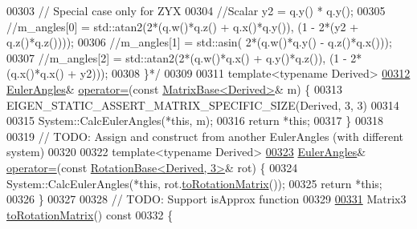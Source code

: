 \begin{DoxyCode}
00303 \textcolor{comment}{        // Special case only for ZYX}
00304 \textcolor{comment}{        //Scalar y2 = q.y() * q.y();}
00305 \textcolor{comment}{        //m\_angles[0] = std::atan2(2*(q.w()*q.z() + q.x()*q.y()), (1 - 2*(y2 + q.z()*q.z())));}
00306 \textcolor{comment}{        //m\_angles[1] = std::asin( 2*(q.w()*q.y() - q.z()*q.x()));}
00307 \textcolor{comment}{        //m\_angles[2] = std::atan2(2*(q.w()*q.x() + q.y()*q.z()), (1 - 2*(q.x()*q.x() + y2)));}
00308 \textcolor{comment}{      \}*/}
00309       
00311       \textcolor{keyword}{template}<\textcolor{keyword}{typename} Derived>
\hyperlink{class_eigen_1_1_euler_angles_af11e32e3584251f0dce65811ac6ad3b4}{00312}       \hyperlink{class_eigen_1_1_euler_angles}{EulerAngles}& \hyperlink{class_eigen_1_1_euler_angles_af11e32e3584251f0dce65811ac6ad3b4}{operator=}(\textcolor{keyword}{const} \hyperlink{group___core___module_class_eigen_1_1_matrix_base}{MatrixBase<Derived>}& m) \{
00313         EIGEN\_STATIC\_ASSERT\_MATRIX\_SPECIFIC\_SIZE(Derived, 3, 3)
00314         
00315         System::CalcEulerAngles(*\textcolor{keyword}{this}, m);
00316         \textcolor{keywordflow}{return} *\textcolor{keyword}{this};
00317       \}
00318 
00319       \textcolor{comment}{// TODO: Assign and construct from another EulerAngles (with different system)}
00320       
00322       \textcolor{keyword}{template}<\textcolor{keyword}{typename} Derived>
\hyperlink{class_eigen_1_1_euler_angles_abc2256872ea7e285cb915b8af82b6810}{00323}       \hyperlink{class_eigen_1_1_euler_angles}{EulerAngles}& \hyperlink{class_eigen_1_1_euler_angles_abc2256872ea7e285cb915b8af82b6810}{operator=}(\textcolor{keyword}{const} \hyperlink{class_eigen_1_1_rotation_base}{RotationBase<Derived, 3>}& 
      rot) \{
00324         System::CalcEulerAngles(*\textcolor{keyword}{this}, rot.\hyperlink{class_eigen_1_1_rotation_base_aac726e89402a427c605514ce31b01e42}{toRotationMatrix}());
00325         \textcolor{keywordflow}{return} *\textcolor{keyword}{this};
00326       \}
00327       
00328       \textcolor{comment}{// TODO: Support isApprox function}
00329 
\hyperlink{class_eigen_1_1_euler_angles_a11ec16b3ed918fac62d295012ec4e2ac}{00331}       Matrix3 \hyperlink{class_eigen_1_1_euler_angles_a11ec16b3ed918fac62d295012ec4e2ac}{toRotationMatrix}()\textcolor{keyword}{ const}
00332 \textcolor{keyword}{      }\{

\end{DoxyCode}
